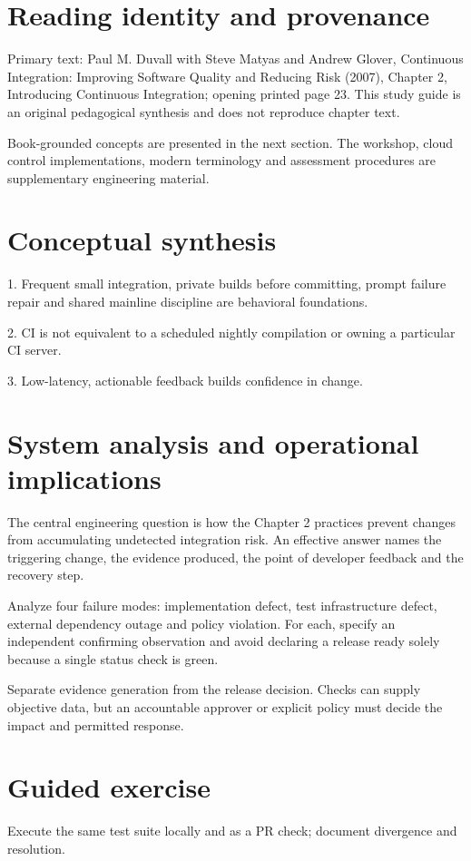 \documentclass[11pt,letterpaper]{article}
\begin{document}
\makedoctitle
\makedocsummary
\tableofcontents
\clearpage
\section{Reading identity and provenance}
Primary text: Paul M. Duvall with Steve Matyas and Andrew Glover, Continuous Integration: Improving Software Quality and Reducing Risk (2007), Chapter 2, Introducing Continuous Integration; opening printed page 23. This study guide is an original pedagogical synthesis and does not reproduce chapter text.

Book-grounded concepts are presented in the next section. The workshop, cloud control implementations, modern terminology and assessment procedures are supplementary engineering material.

\section{Conceptual synthesis}
1. Frequent small integration, private builds before committing, prompt failure repair and shared mainline discipline are behavioral foundations.

2. CI is not equivalent to a scheduled nightly compilation or owning a particular CI server.

3. Low-latency, actionable feedback builds confidence in change.

\section{System analysis and operational implications}
The central engineering question is how the Chapter 2 practices prevent changes from accumulating undetected integration risk. An effective answer names the triggering change, the evidence produced, the point of developer feedback and the recovery step.

Analyze four failure modes: implementation defect, test infrastructure defect, external dependency outage and policy violation. For each, specify an independent confirming observation and avoid declaring a release ready solely because a single status check is green.

Separate evidence generation from the release decision. Checks can supply objective data, but an accountable approver or explicit policy must decide the impact and permitted response.

\section{Guided exercise}
Execute the same test suite locally and as a PR check; document divergence and resolution.
\end{document}
